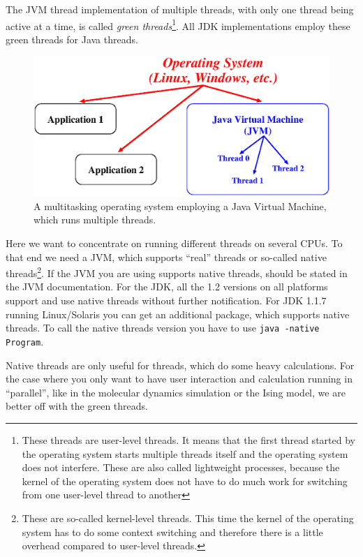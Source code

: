 The JVM thread implementation of multiple threads, with only one thread
being active at a time, is called \emph{green threads}\footnote{These
threads are user-level threads. It means that the first thread started by the
operating system starts multiple threads itself and the operating system
does not interfere. These are also called lightweight processes, because
the kernel of the operating system does not have to do much work for
switching from one user-level thread to another}. All JDK 
implementations employ these green threads for Java threads.

\begin{figure}[htbp]
  \begin{center}
    \includegraphics[width=\textwidth]{Figures/Threads.eps}
    \caption{A multitasking operating system employing a Java Virtual Machine, which runs multiple threads.}
    \label{fig:Threads}
  \end{center}
\end{figure}

Here we want to concentrate on running different threads on several CPUs.
To that end we need a JVM, which supports ``real'' threads or so-called
native threads\footnote{These are so-called kernel-level threads. This time the
kernel of the operating system has to do some context switching and
therefore there is a little overhead compared to user-level threads.}. 
If the JVM you are using supports native threads, should be stated in 
the JVM documentation. 
For the JDK, all the 1.2 versions on all platforms support and
use native threads without further notification. For JDK 1.1.7 running
Linux/Solaris you can get an additional package, which supports native
threads. To call the native threads version you have to use
\verb|java -native Program|.

Native threads are only useful for threads, which do some heavy calculations.
For the case where you only want to have user interaction and calculation
running in ``parallel'', like in the molecular dynamics simulation or the
Ising model, we are better off with the green threads. 

